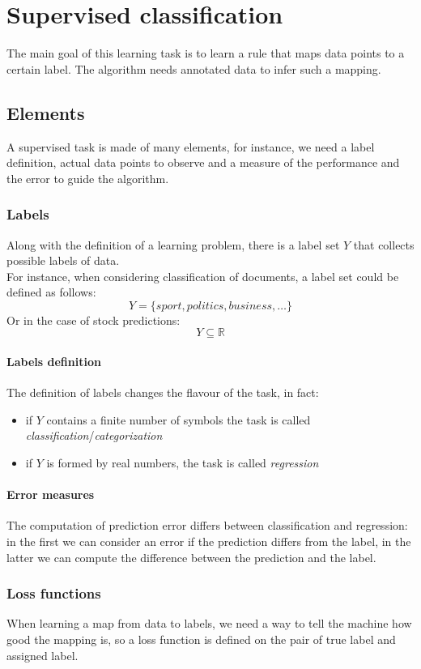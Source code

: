 \section{Supervised classification}

The main goal of this learning task is to learn a rule that maps data points
to a certain label.
The algorithm needs annotated data to infer such a mapping.
\subsection{Elements}
A supervised task is made of many elements, for instance, we need a label definition, 
actual data points to observe and a measure of the performance and the error to guide the 
algorithm.

\subsubsection{Labels}
Along with the definition of a learning problem, there is a label set $Y$ that collects
possible labels of data.\\
For instance, when considering classification of documents, a label set could be defined 
as follows: 
$$Y = \{\mathit{sport}, \mathit{politics}, \mathit{business}, \dots\}$$
Or in the case of stock predictions:
$$Y \subseteq \mathbb{R}$$

\paragraph{Labels definition}
The definition of labels changes the flavour of the task, in fact:
\begin{itemize}
    \item if $Y$ contains a finite number of symbols the task 
    is called \emph{classification}/\emph{categorization}
    \item if $Y$ is formed by real numbers, the task is called \emph{regression}
\end{itemize}

\paragraph{Error measures}
The computation of prediction error differs between classification and regression:
in the first we can consider an error if the prediction differs from the label, 
in the latter we can compute the difference between the prediction and the label.

\subsubsection{Loss functions}
When learning a map from data to labels, we need a way to tell the machine how good
the mapping is, so a loss function is defined on the pair of true label and assigned label.

